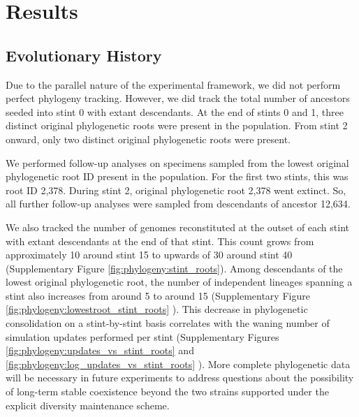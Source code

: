 \section{Results}

\subsection{Evolutionary History}

Due to the parallel nature of the experimental framework, we did not perform perfect phylogeny tracking.
However, we did track the total number of ancestors seeded into stint 0 with extant descendants.
At the end of stints 0 and 1, three distinct original phylogenetic roots were present in the population.
From stint 2 onward, only two distinct original phylogenetic roots were present.

We performed follow-up analyses on specimens sampled from the lowest original phylogenetic root ID present in the population.
For the first two stints, this was root ID 2,378.
During stint 2, original phylogenetic root 2,378 went extinct.
So, all further follow-up analyses were sampled from descendants of ancestor 12,634.

We also tracked the number of genomes reconstituted at the outset of each stint with extant descendants at the end of that stint.
This count grows from approximately 10 around stint 15 to upwards of 30 around stint 40 (Supplementary Figure \ref{fig:phylogeny:stint_roots}\citep{Moreno_2021}).
Among descendants of the lowest original phylogenetic root, the number of independent lineages spanning a stint also increases from around 5 to around 15
(Supplementary Figure \ref{fig:phylogeny:lowestroot_stint_roots} \citep{Moreno_2021}).
This decrease in phylogenetic consolidation on a stint-by-stint basis correlates with the waning number of simulation updates performed per stint (Supplementary Figures \ref{fig:phylogeny:updates_vs_stint_roots} and \ref{fig:phylogeny:log_updates_vs_stint_roots} \citep{Moreno_2021}).
More complete phylogenetic data will be necessary in future experiments to address questions about the possibility of long-term stable coexistence beyond the two strains supported under the explicit diversity maintenance scheme.

